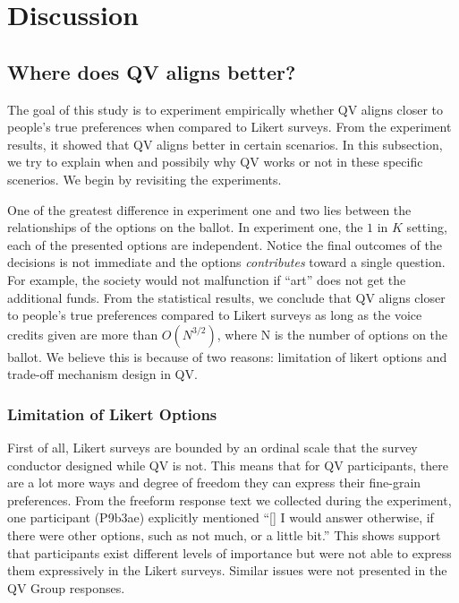\section{Discussion} \label{discussion}

\subsection{Where does QV aligns better?}
The goal of this study is to 
experiment empirically whether
QV aligns closer to people's true preferences 
when compared to Likert surveys.
From the experiment results,
it showed that QV aligns better 
in certain scenarios.
In this subsection,
we try to explain when and possibily why
QV works or not in these specific scenerios.
We begin by revisiting the experiments.

One of the greatest difference
in experiment one and two
lies between the relationships of
the options on the ballot.
In experiment one,
the $1$ in $K$ setting,
each of the presented options
are independent.
Notice the final outcomes 
of the decisions
is not immediate and 
the options \textit{contributes}
toward a single question.
For example,
the society would not malfunction if ``art''
does not get the additional funds.
From the statistical results, we conclude that QV aligns closer to people's true preferences
compared to Likert surveys
as long as the voice credits given
are more than $O(N^{3/2})$, where N is the number of options on the ballot.
We believe this is because of two reasons:
limitation of likert options and
trade-off mechanism design in QV.

\subsubsection{Limitation of Likert Options}
First of all, 
Likert surveys are bounded by an ordinal scale 
that the survey conductor designed while QV is not.
This means that 
for QV participants,
there are a lot more ways
and degree of freedom
they can express
their fine-grain preferences.
From the freeform response text we collected
during the experiment,
one participant (P9b3ae) explicitly mentioned ``[\textellipsis] I would answer otherwise, if there were other options, such as not much, or a little bit.''
This shows support that
participants exist different levels of importance 
but were not able to express them expressively 
in the Likert surveys.
Similar issues were not presented
in the QV Group responses.


